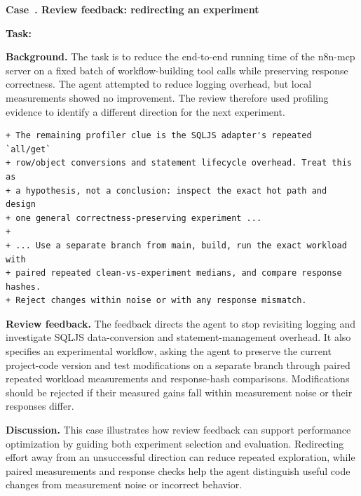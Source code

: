 \par\medskip
{}
\label{case:feedback}
\noindent\textbf{Case~\theharnesscase. Review feedback: redirecting an experiment}
\par\nopagebreak

\noindent\textbf{Task:} {\small{}}

\textbf{Background.}
The task is to reduce the end-to-end running time of the n8n-mcp server on a fixed batch of workflow-building tool calls while preserving response correctness. The agent attempted to reduce logging overhead, but local measurements showed no improvement. The review therefore used profiling evidence to identify a different direction for the next experiment.

\noindent\begin{minipage}{\linewidth}
\begin{lstlisting}[linebackgroundcolor={\DiffBackground{1,2,3,4,5,6,7,8}{}}]
+ The remaining profiler clue is the SQLJS adapter's repeated `all/get`
+ row/object conversions and statement lifecycle overhead. Treat this as
+ a hypothesis, not a conclusion: inspect the exact hot path and design
+ one general correctness-preserving experiment ...
+
+ ... Use a separate branch from main, build, run the exact workload with
+ paired repeated clean-vs-experiment medians, and compare response hashes.
+ Reject changes within noise or with any response mismatch.
\end{lstlisting}
\end{minipage}

\textbf{Review feedback.}
The feedback directs the agent to stop revisiting logging and investigate SQLJS data-conversion and statement-management overhead. It also specifies an experimental workflow, asking the agent to preserve the current project-code version and test modifications on a separate branch through paired repeated workload measurements and response-hash comparisons. Modifications should be rejected if their measured gains fall within measurement noise or their responses differ.

\textbf{Discussion.}
This case illustrates how review feedback can support performance optimization by guiding both experiment selection and evaluation. Redirecting effort away from an unsuccessful direction can reduce repeated exploration, while paired measurements and response checks help the agent distinguish useful code changes from measurement noise or incorrect behavior.

